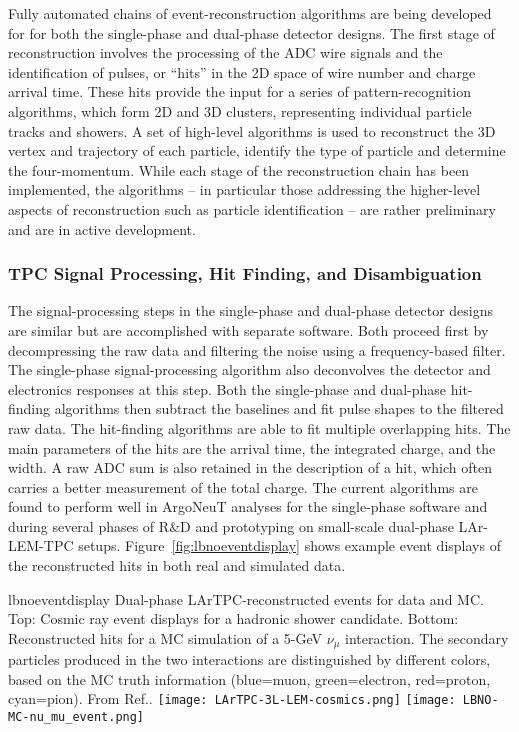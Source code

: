 Fully automated chains of event-reconstruction algorithms are being
developed for for both the single-phase and
dual-phase detector designs.  The first stage of reconstruction involves the
processing of the ADC wire signals and the identification of pulses,
or ``hits'' in the 2D space of wire number and charge
arrival time.  These hits provide the input for a series of
pattern-recognition algorithms, which form 2D and 3D clusters,
representing individual particle tracks and showers.  A set of
high-level algorithms is used to reconstruct the 3D vertex and
trajectory of each particle, identify the type of particle and
determine the four-momentum.  While each stage of the reconstruction
chain has been implemented, the algorithms -- in particular those
addressing the higher-level aspects of reconstruction such as particle
identification -- are rather preliminary and are in active
development.



\subsubsection{TPC Signal Processing, Hit Finding, and Disambiguation}

The signal-processing steps in the single-phase and dual-phase
detector designs are similar but are accomplished with separate software.
Both proceed first by decompressing the raw data and filtering the
noise using a frequency-based filter.  The single-phase
signal-processing algorithm also deconvolves the detector and
electronics responses at this step.  Both the single-phase and
dual-phase hit-finding algorithms then subtract the baselines and fit
pulse shapes to the filtered raw data.  The hit-finding algorithms are
able to fit multiple overlapping hits.  The main parameters of the
hits are the arrival time, the integrated charge, and the width.  A
raw ADC sum is also retained in the description of a hit, which often
carries a better measurement of the total charge.  The current
algorithms are found to perform well in ArgoNeuT
analyses\cite{Anderson:2012vc} for the single-phase software and
during several phases of R$\&$D and prototyping on small-scale
dual-phase LAr-LEM-TPC
setups\cite{Badertscher:2008rf,Badertscher:2012dq}.
Figure~\ref{fig:lbnoeventdisplay} shows example event displays of the
reconstructed hits in both real and simulated data.

\begin{cdrfigure}{lbnoeventdisplay}
{
Dual-phase LArTPC-reconstructed events for data and MC.  Top: Cosmic
ray event displays for a hadronic shower candidate.  Bottom:
Reconstructed hits for a MC simulation of a 5-GeV $\nu_{\mu}$
interaction.  The secondary particles produced in the two interactions
are distinguished by different colors, based on the MC truth
information (blue=muon, green=electron, red=proton, cyan=pion).  From
Ref.\cite{Badertscher:2012dq}.  }
\texttt{[image: LArTPC-3L-LEM-cosmics.png]}
\texttt{[image: LBNO-MC-nu\_mu\_event.png]}
\end{cdrfigure}


